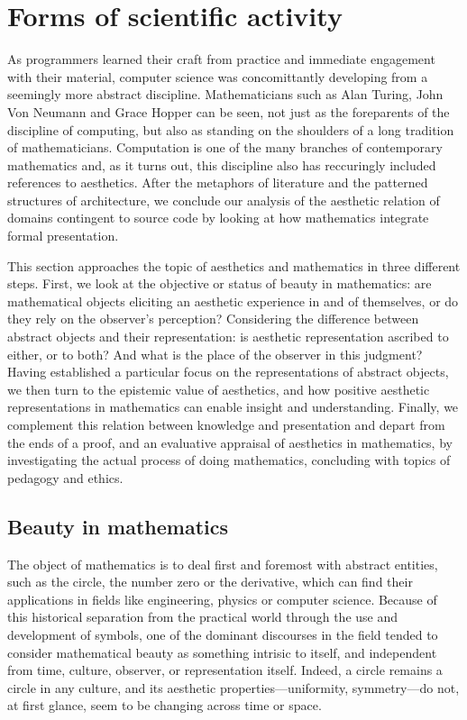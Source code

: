 \section{Forms of scientific activity}
\label{sec:aesthetic-scientific}

As programmers learned their craft from practice and immediate engagement with their material, computer science was concomittantly developing from a seemingly more abstract discipline. Mathematicians such as Alan Turing, John Von Neumann and Grace Hopper can be seen, not just as the foreparents of the discipline of computing, but also as standing on the shoulders of a long tradition of mathematicians. Computation is one of the many branches of contemporary mathematics and, as it turns out, this discipline also has reccuringly included references to aesthetics. After the metaphors of literature and the patterned structures of architecture, we conclude our analysis of the aesthetic relation of domains contingent to source code by looking at how mathematics integrate formal presentation.

This section approaches the topic of aesthetics and mathematics in three different steps. First, we look at the objective or status of beauty in mathematics: are mathematical objects eliciting an aesthetic experience in and of themselves, or do they rely on the observer's perception? Considering the difference between abstract objects and their representation: is aesthetic representation ascribed to either, or to both? And what is the place of the observer in this judgment? Having  established a particular focus on the representations of abstract objects, we then turn to the epistemic value of aesthetics, and how positive aesthetic representations in mathematics can enable insight and understanding. Finally, we complement this relation between knowledge and presentation and depart from the ends of a proof, and an evaluative appraisal of aesthetics in mathematics, by investigating the actual process of doing mathematics, concluding with topics of pedagogy and ethics.

\subsection{Beauty in mathematics}
\label{subsec:beauty-mathematics}

The object of mathematics is to deal first and foremost with abstract entities, such as the circle, the number zero or the derivative, which can find their applications in fields like engineering, physics or computer science. Because of this historical separation from the practical world through the use and development of symbols, one of the dominant discourses in the field tended to consider mathematical beauty as something intrisic to itself, and independent from time, culture, observer, or representation itself. Indeed, a circle remains a circle in any culture, and its aesthetic properties—uniformity, symmetry—do not, at first glance, seem to be changing across time or space.

